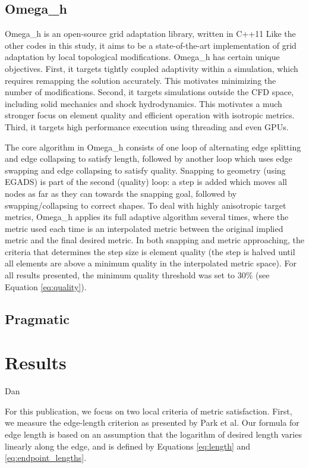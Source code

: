 \documentclass[3p,times,procedia,number]{elsarticle}
\begin{document}
\subsection{Omega\_h}

Omega\_h is an open-source grid adaptation library, written in C++11
\cite{ibanez-phd-thesis-heterogeneous-adapt,
ibanez-shephard-moving-shared-mem,
omega_h-website}
Like the other codes in this study, it aims to be a state-of-the-art
implementation of grid adaptation by local topological modifications.
Omega\_h has certain unique objectives.
First, it targets tightly coupled adaptivity within a simulation,
which requires remapping the solution accurately.
This motivates minimizing the number of modifications.
Second, it targets simulations outside the CFD space, including
solid mechanics and shock hydrodynamics.
This motivates a much stronger focus on element quality
and efficient operation with isotropic metrics.
Third, it targets high performance execution using threading
and even GPUs.

The core algorithm in Omega\_h consists of one loop of alternating
edge splitting and edge collapsing to satisfy length, followed by another loop
which uses edge swapping and edge collapsing to satisfy quality.
Snapping to geometry (using EGADS) is part of the second (quality) loop:
a step is added which moves all nodes as far as they can towards
the snapping goal, followed by swapping/collapsing to correct shapes.
To deal with highly anisotropic target metrics, Omega\_h applies
its full adaptive algorithm several times, where the metric used
each time is an interpolated metric between the original implied metric
and the final desired metric.
In both snapping and metric approaching, the criteria that determines
the step size is element quality (the step is halved until all elements
are above a minimum quality in the interpolated metric space).
For all results presented, the minimum quality threshold was set to 30\%
(see Equation \ref{eq:quality}).

\subsection{Pragmatic}



\section{Results}
{\color{red} Dan}

For this publication, we focus on two local criteria of metric
satisfaction.
First, we measure the edge-length criterion as presented
by Park et al.\cite{park-loseille-krakos-michal-adapt-decomposition}
Our formula for edge length is based on an assumption
that the logarithm of desired length varies linearly along the
edge,\cite{alauzet-fead-2010-size-gradation-aniso} and is defined
by Equations \ref{eq:length} and \ref{eq:endpoint_lengths}.
\end{document}
